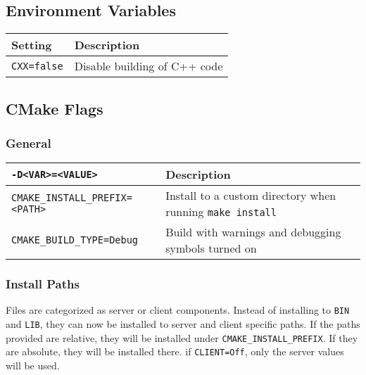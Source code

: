 \subsection{Environment Variables}
\begin{table}[h!]
\centering
\begin{tabularx}{1.2\textwidth}{| l | X |}
  \hline
  Setting & Description \\
  \hline
  \texttt{CXX=false} & Disable building of C++ code \\
  \hline
\end{tabularx}
\end{table}

\subsection{CMake Flags}

\subsubsection{General}
\begin{table}[h!]
\centering
\begin{tabularx}{1.2\textwidth}{| l | X |}
  \hline
  \texttt{-D<VAR>=<VALUE>} & Description \\
  \hline
  \texttt{CMAKE\_INSTALL\_PREFIX=<PATH>}
  & Install to a custom directory when running \texttt{make install} \\
  \hline
  \texttt{CMAKE\_BUILD\_TYPE=Debug}
  & Build with warnings and debugging symbols turned on \\
  \hline
\end{tabularx}
\end{table}

\subsubsection{Install Paths}
Files are categorized as server or client components. Instead of
installing to \texttt{BIN} and \texttt{LIB}, they can now be installed
to server and client specific paths. If the paths provided are
relative, they will be installed under
\texttt{CMAKE\_INSTALL\_PREFIX}. If they are absolute, they will be
installed there. if \texttt{CLIENT=Off}, only the server values will
be used.

